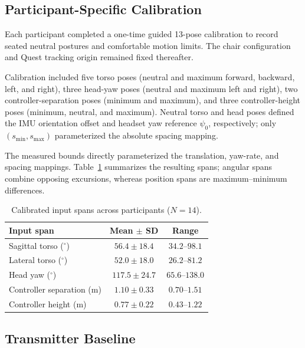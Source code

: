 \subsection{Participant-Specific Calibration}
\label{sec:calibration}

Each participant completed a one-time guided 13-pose calibration to record
seated neutral postures and comfortable motion limits. The chair configuration and Quest tracking origin remained fixed thereafter.

Calibration included five torso poses (neutral and maximum forward, backward,
left, and right), three head-yaw poses (neutral and maximum left and right),
two controller-separation poses (minimum and maximum), and three
controller-height poses (minimum, neutral, and maximum). Neutral torso and head
poses defined the IMU orientation offset and headset yaw reference $\psi_0$,
respectively; only $(s_{\min},s_{\max})$ parameterized the absolute spacing
mapping.

The measured bounds directly parameterized the translation, yaw-rate, and
spacing mappings.
Table~\ref{tab:calibration_summary} summarizes the resulting spans; angular
spans combine opposing excursions, whereas position spans are
maximum--minimum differences.

\begin{table}[!tb]
\centering
\caption{Calibrated input spans across participants ($N=14$).}
\label{tab:calibration_summary}
\footnotesize
\setlength{\tabcolsep}{3.5pt}
\begin{tabular}{@{}lcc@{}}
\toprule
Input span & Mean $\pm$ SD & Range \\
\midrule
Sagittal torso ($^\circ$)       & $56.4 \pm 18.4$  & $34.2$--$98.1$ \\
Lateral torso ($^\circ$)        & $52.0 \pm 18.0$  & $26.2$--$81.2$ \\
Head yaw ($^\circ$)             & $117.5 \pm 24.7$ & $65.6$--$138.0$ \\
Controller separation (m)       & $1.10 \pm 0.33$  & $0.70$--$1.51$ \\
Controller height (m)           & $0.77 \pm 0.22$  & $0.43$--$1.22$ \\
\bottomrule
\end{tabular}
\end{table}

\subsection{Transmitter Baseline}
\label{sec:transmitter}

